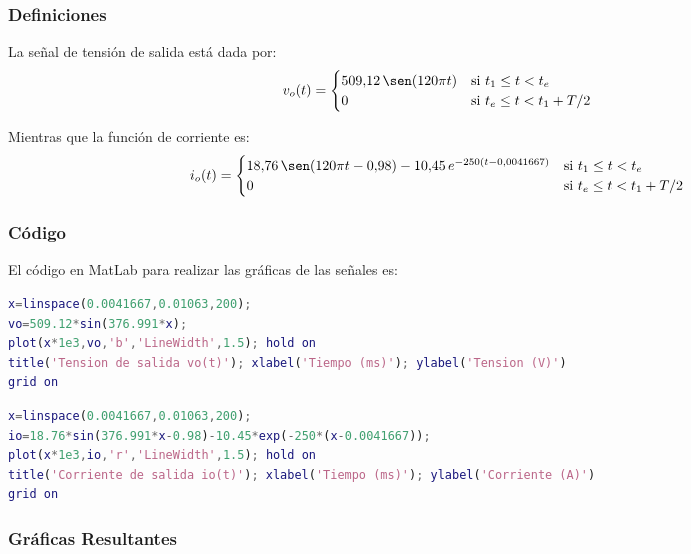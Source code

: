 \documentclass[11pt]{article}
\begin{document}
\subsubsection{Definiciones}

La se\~nal de tensi\'on de salida est\'a dada por:
\begin{align*}
v_o(t) = \begin{cases} 509{,}12\,\sen(120\pi t) & \text{si } t_1 \le t < t_e \\ 0 & \text{si } t_e \le t < t_1+T/2 \end{cases}
\end{align*}

Mientras que la funci\'on de corriente es:
\begin{align*}
i_o(t) = \begin{cases} 18{,}76\,\sen(120\pi t - 0{,}98) - 10{,}45\,e^{-250(t-0{,}0041667)} & \text{si } t_1 \le t < t_e \\ 0 & \text{si } t_e \le t < t_1+T/2 \end{cases}
\end{align*}

\subsubsection{C\'odigo}

El c\'odigo en MatLab para realizar las gr\'aficas de las se\~nales es:

\begin{lstlisting}[language=Matlab, caption={C\'odigo MATLAB -- $v_o(t)$, Ejercicio 5}, label={lst:ex5vo}]
x=linspace(0.0041667,0.01063,200);
vo=509.12*sin(376.991*x);
plot(x*1e3,vo,'b','LineWidth',1.5); hold on
title('Tension de salida vo(t)'); xlabel('Tiempo (ms)'); ylabel('Tension (V)')
grid on
\end{lstlisting}

\begin{lstlisting}[language=Matlab, caption={C\'odigo MATLAB -- $i_o(t)$, Ejercicio 5}, label={lst:ex5io}]
x=linspace(0.0041667,0.01063,200);
io=18.76*sin(376.991*x-0.98)-10.45*exp(-250*(x-0.0041667));
plot(x*1e3,io,'r','LineWidth',1.5); hold on
title('Corriente de salida io(t)'); xlabel('Tiempo (ms)'); ylabel('Corriente (A)')
grid on
\end{lstlisting}

\subsubsection{Gr\'aficas Resultantes}
\end{document}
